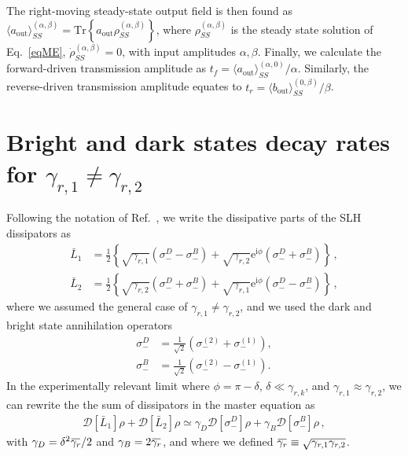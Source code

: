 \documentclass[pra, twocolumn, amsmath, amssymb, notitlepage, longbibliography, showpacs, superscriptaddress]{revtex4-1}
\newcommand{\ee}{\mathrm{e}}						%
\newcommand{\ii}{\mathrm{i}}			             			%
\newcommand{\nn}{\nonumber}							%
\newcommand{\diss}[1]{\mathcal{D}[ #1 ]}					%
\renewcommand{\l}[0]{\left}
\renewcommand{\r}[0]{\right}
\newcommand{\overbar}[1]{\mkern 1.5mu\overline{\mkern-1.5mu#1\mkern-1.5mu}\mkern 1.5mu}
\begin{document}
The right-moving steady-state output field is then found as
$\langle a_{\text{out}} \rangle^{(\alpha,\beta)}_{SS} =  \text{Tr}\l\{  a_\textrm{out} \rho^{(\alpha,\beta)}_{SS} \r\}$,
where $\rho^{(\alpha,\beta)}_{SS}$ is the steady state solution of Eq.~\ref{eqME}, $\dot\rho_{SS}^{(\alpha,\beta)}=0$, with input amplitudes $\alpha,\beta$.
Finally, we calculate the forward-driven transmission amplitude as 
$t_f = \langle a_{\text{out}} \rangle^{(\alpha,0)}_{SS}/\alpha$.
Similarly, the reverse-driven transmission amplitude equates 
to $t_r = \langle b_{\text{out}} \rangle^{(0,\beta)}_{SS}/\beta$.


\section{Bright and dark states decay rates for $\gamma_{r,1}\neq\gamma_{r,2}$}


Following the notation of Ref.~\cite{Muller2017a}, we write the dissipative parts of the
SLH dissipators as
\begin{align*}
	\bar L_{1} &= \frac12 \l\{ \sqrt{\gamma_{r,1}} \l( \sigma_{-}^{D} - \sigma_{-}^{B} \r) + \sqrt{\gamma_{r,2}} \ee^{\ii \phi} \l( \sigma_{-}^{D} + \sigma_{-}^{B} \r) \r\} \,,\nn\\
	\bar L_{2} &= \frac12 \l\{ \sqrt{\gamma_{r,2}} \l( \sigma_{-}^{D} + \sigma_{-}^{B} \r) + \sqrt{\gamma_{r,1}} \ee^{\ii \phi} \l( \sigma_{-}^{D} - \sigma_{-}^{B} \r) \r\} \,, 
\end{align*}
where we assumed the general case of $\gamma_{r,1} \neq \gamma_{r,2}$, 
and we used the dark and bright state annihilation operators
\begin{align*}
	\sigma_{-}^{D} &= \frac{1}{\sqrt2} \l( \sigma_{-}^{(2)} + \sigma_{-}^{(1)} \r), \\
	\sigma_{-}^{B} &= \frac{1}{\sqrt2} \l( \sigma_{-}^{(2)} - \sigma_{-}^{(1)} \r).
\end{align*}
In the experimentally relevant limit where $\phi=\pi - \delta$, $\delta \ll \gamma_{r,k}$, and $\gamma_{r,1}\approx \gamma_{r,2}$,
we can rewrite the the sum of dissipators in the master equation as
\begin{align}
	\diss{\bar L_{1}}\rho + \diss{\bar L_{2}}\rho \simeq \gamma_{D}\diss{\sigma_{-}^{D}}\rho + \gamma_{B}\diss{\sigma_{-}^{B}}\rho \,,
\end{align}
with $\gamma_D = \delta^2 \overbar{\gamma_r}/2$ and $\gamma_B = 2 \overbar{\gamma_r}$,
and where we defined $\overbar{\gamma_r} \equiv \sqrt{\gamma_{r,1} \gamma_{r,2}}$.
\end{document}
